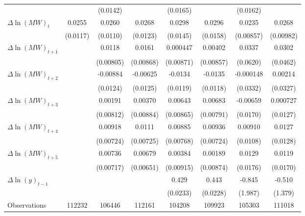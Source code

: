 {\begin{tabular}{l*{7}{c}}
          &                  & (0.0142)         &                  & (0.0165)         &                  & (0.0162)         &                  \\
[1em]
$\Delta \ln(MW)_{t}$&   0.0255\sym{**} &   0.0260\sym{**} &   0.0268\sym{**} &   0.0298\sym{**} &   0.0296\sym{*}  &   0.0235\sym{***}&   0.0268\sym{***}\\
          & (0.0117)         & (0.0110)         & (0.0123)         & (0.0145)         & (0.0158)         &(0.00857)         &(0.00982)         \\
[1em]
$\Delta \ln(MW)_{t+1}$&                  &   0.0118         &   0.0161\sym{*}  & 0.000447         &  0.00402         &   0.0337         &   0.0302         \\
          &                  &(0.00805)         &(0.00868)         &(0.00871)         &(0.00857)         & (0.0620)         & (0.0462)         \\
[1em]
$\Delta \ln(MW)_{t+2}$&                  & -0.00884         & -0.00625         &  -0.0134         &  -0.0135         &-0.000148         &  0.00214         \\
          &                  & (0.0124)         & (0.0125)         & (0.0119)         & (0.0118)         & (0.0332)         & (0.0327)         \\
[1em]
$\Delta \ln(MW)_{t+3}$&                  &  0.00191         &  0.00370         &  0.00643         &  0.00683         & -0.00659         & 0.000727         \\
          &                  &(0.00812)         &(0.00884)         &(0.00865)         &(0.00791)         & (0.0170)         & (0.0127)         \\
[1em]
$\Delta \ln(MW)_{t+4}$&                  &  0.00918         &   0.0111         &  0.00885         &  0.00936         &  0.00910         &   0.0127         \\
          &                  &(0.00724)         &(0.00725)         &(0.00768)         &(0.00724)         & (0.0108)         & (0.0128)         \\
[1em]
$\Delta \ln(MW)_{t+5}$&                  &  0.00736         &  0.00679         &  0.00384         &  0.00189         &   0.0129         &   0.0119         \\
          &                  &(0.00717)         &(0.00651)         &(0.00915)         &(0.00874)         & (0.0176)         & (0.0170)         \\
[1em]
$\Delta \ln(y)_{t-1}$&                  &                  &                  &    0.429\sym{***}&    0.443\sym{***}&   -0.845         &   -0.510         \\
          &                  &                  &                  & (0.0233)         & (0.0228)         &  (1.987)         &  (1.379)         \\
\hline
Observations&   112232         &   106446         &   112161         &   104208         &   109923         &   105303         &   111018         \\
\hline\hline
\end{tabular}
}
